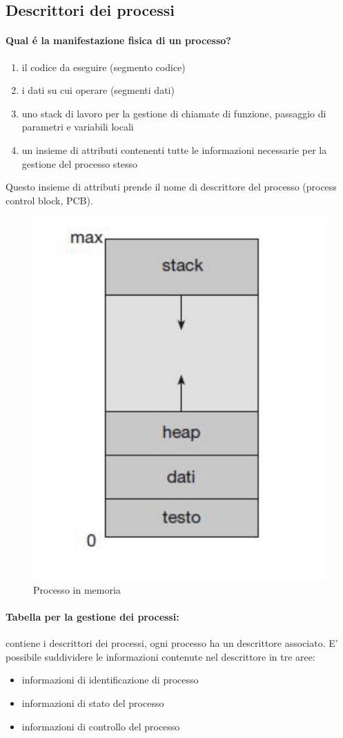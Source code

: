 \subsection{Descrittori dei processi}
\paragraph{Qual é la manifestazione fisica di un processo?}

\begin{enumerate}
    \item il codice da eseguire (segmento codice)
    \item i dati su cui operare (segmenti dati)
    \item uno stack di lavoro per la gestione di chiamate di funzione, passaggio di
parametri e variabili locali
    \item un insieme di attributi contenenti tutte le informazioni necessarie per la gestione del processo stesso

\end{enumerate}

Questo insieme di attributi prende il nome di descrittore del processo (process control block, PCB).

\begin{figure} [h]
    \centering
    \includegraphics[width=0.3\linewidth]{Images/Screenshot 2024-12-18 at 18-22-19 so-02.1-scheduling - so-02.1-scheduling.pdf.png}
    \caption{Processo in memoria}
\end{figure}
\newpage
\paragraph{Tabella per la gestione dei processi:} contiene i descrittori dei processi, ogni processo ha un descrittore associato.
E' possibile suddividere le informazioni contenute nel descrittore in tre aree:
\begin{itemize}
    \item informazioni di identificazione di processo
    \item informazioni di stato del processo
    \item informazioni di controllo del processo
\end{itemize}

